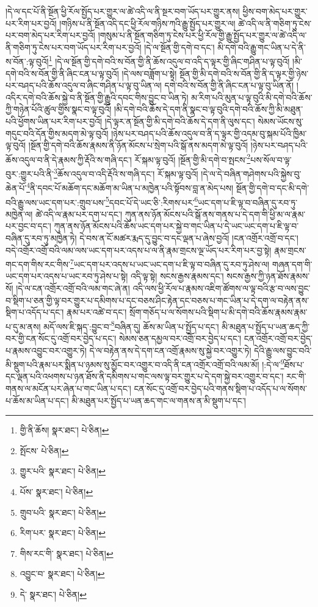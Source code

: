 །དེ་ལ་དང་པོ་ནི་སྔོན་ཕྱི་རོལ་སྤྱོད་པར་གྱུར་ལ་ཚེ་འདི་ལ་ནི་སྔར་བག་ཡོད་པར་གྱུར་ནས། ཕྱིས་བག་མེད་པར་གྱུར་པར་རིག་པར་བྱའོ། །གཉིས་པ་ནི་སྔོན་འདི་དང་ཕྱི་རོལ་གཉིས་ཀའི་རྒྱུ་སྤྱོད་པར་གྱུར་ལ། ཚེ་འདི་ལ་ནི་གཅིག་ཏུ་ངེས་པར་བག་མེད་པར་རིག་པར་བྱའོ། །གསུམ་པ་ནི་སྔོན་གཅིག་ཏུ་ངེས་པར་ཕྱི་རོལ་གྱི་རྒྱུ་སྤྱོད་པར་གྱུར་ལ་ཚེ་འདི་ལ་ནི་གཅིག་ཏུ་ངེས་པར་བག་ཡོད་པར་རིག་པར་བྱའོ། །དེ་ལ་སྔོན་གྱི་དགེ་བ་དང་། མི་དགེ་བའི་རྒྱུ་གང་ཡིན་པ་དེ་ནི་ས་བོན་:ལྟ་བུའོ།\footnote{གྱི་ནི་ཆོས།  སྣར་ཐང་།  པེ་ཅིན། } །དེ་ལ་སྔོན་གྱི་དགེ་བའི་ས་བོན་གྱི་ནི་ཆོས་འདུལ་བ་འདི་ད་ལྟར་གྱི་ཞིང་གཤིན་པ་ལྟ་བུའོ། །མི་དགེ་བའི་ས་བོན་གྱི་ནི་ཞིང་ངན་པ་ལྟ་བུའོ། །དེ་ལས་བཟློག་པ་སྟེ། སྔོན་གྱི་མི་དགེ་བའི་ས་བོན་གྱི་ནི་ད་ལྟར་གྱི་ཉེས་པར་བཤད་པའི་ཆོས་འདུལ་བ་ཞིང་གཤིན་པ་ལྟ་བུ་ཡིན་ལ། དགེ་བའི་ས་བོན་གྱི་ནི་ཞིང་ངན་པ་ལྟ་བུ་ཡིན་ནོ། །འདིར་དགེ་བའི་ཆོས་སྐྱེ་བ་ནི་སྔོན་གྱི་རྒྱུའི་དབང་གིས་བྱུང་བ་ཡིན་ཏེ། མ་རིག་པའི་མུན་པ་ལྟ་བུའི་མི་དགེ་བའི་ཆོས་ཀྱི་གཉེན་པོའི་ཚུལ་གྱིས་སྣང་བ་ལྟ་བུའོ། །མི་དགེ་བའི་ཆོས་དེ་དག་ནི་སྣང་བ་ལྟ་བུའི་དགེ་བའི་ཆོས་ཀྱི་མི་མཐུན་པའི་ཕྱོགས་ཡིན་པར་རིག་པར་བྱའོ། །དེ་ལྟར་ན་སྔོན་གྱི་མི་དགེ་བའི་ཆོས་དེ་དག་ནི་ལུས་དང་། སེམས་ཡོངས་སུ་གདུང་བའི་དོན་གྱིས་མདག་མེ་ལྟ་བུའོ། །ཉེས་པར་བཤད་པའི་ཆོས་འདུལ་བ་ནི་ད་ལྟར་གྱི་འདམ་བུ་སྐམ་པོའི་ཁྱིམ་ལྟ་བུའོ། །སྔོན་གྱི་དགེ་བའི་ཆོས་རྣམས་ནི་ཉོན་མོངས་པ་སྲེག་པའི་སྒོ་ནས་མདག་མེ་ལྟ་བུའོ། །ཉེས་པར་བཤད་པའི་ཆོས་འདུལ་བ་ནི་དེ་རྣམས་ཀྱི་རྡོའི་ས་གཞི་དང་། རོ་སྐམ་ལྟ་བུའོ། །སྔོན་གྱི་མི་དགེ་བ་སྤངས་\footnote{སྤོངས་  པེ་ཅིན། }པས་སོལ་བ་ལྟ་བུར་:གྱུར་པའི་ནི་\footnote{གྱུར་པའི་  སྣར་ཐང་།  པེ་ཅིན། }ཆོས་འདུལ་བ་འདི་རྡོའི་ས་གཞི་དང་། རོ་སྐམ་ལྟ་བུའོ། །དེ་ལ་དེ་བཞིན་གཤེགས་པའི་སྐྱེས་བུ་ཆེན་པོ་\footnote{པོས་  སྣར་ཐང་།  པེ་ཅིན། }ནི་དབང་པོ་མཆོག་དང་མཆོག་མ་ཡིན་པ་མཁྱེན་པའི་སྟོབས་བླ་ན་མེད་པས། སྔོན་གྱི་དགེ་བ་དང་མི་དགེ་བའི་རྒྱུ་ལས་ཡང་དག་པར་:གྲུབ་པས་\footnote{གྲུབ་པའི་  སྣར་ཐང་།  པེ་ཅིན། }དབང་པོ་དེ་ཡང་ཅི་:རིགས་པར་\footnote{རིག་པར་  སྣར་ཐང་།  པེ་ཅིན། }ཡང་དག་པ་ཇི་ལྟ་བ་བཞིན་དུ་རབ་ཏུ་མཁྱེན་ལ། ཚེ་འདི་ལ་རྣམ་པར་དག་པ་དང་། ཀུན་ནས་ཉོན་མོངས་པའི་སྒོ་ནས་གནས་པ་དེ་དག་གི་ཕྱི་མ་ལ་རྣམ་པར་བྱང་བ་དང་། ཀུན་ནས་ཉོན་མོངས་པའི་ཆོས་ཡང་དག་པར་སྐྱེ་བ་གང་ཡིན་པ་དེ་ཡང་ཡང་དག་པ་ཇི་ལྟ་བ་བཞིན་དུ་རབ་ཏུ་མཁྱེན་ཏེ། དེ་བས་ན་ངོ་མཚར་རྨད་དུ་བྱུང་བ་དང་ལྡན་པ་ཞེས་བྱའོ། །ངན་འགྲོར་འགྲོ་བ་དང་། བདེ་འགྲོར་འགྲོ་བའི་ལམ་ལས་ཡང་དག་པར་འདས་པ་ལ་ནི་རྣམ་གྲངས་ལྔ་ཡོད་པར་རིག་པར་བྱ་སྟེ། རྣམ་གྲངས་གང་དག་གིས་རང་གིས་\footnote{གིས་རང་གི་  སྣར་ཐང་།  པེ་ཅིན། }ཡང་དག་པར་འདས་པ་ཡང་ཡང་དག་པ་ཇི་ལྟ་བ་བཞིན་དུ་རབ་ཏུ་ཤེས་ལ། གཞན་དག་གི་ཡང་དག་པར་འདས་པ་ཡང་རབ་ཏུ་ཤེས་པ་སྟེ། འདི་ལྟ་སྟེ། སངས་རྒྱས་རྣམས་དང་། སངས་རྒྱས་ཀྱི་ཉན་ཐོས་རྣམས་སོ། །དེ་ལ་ངན་འགྲོར་འགྲོ་བའི་ལམ་གང་ཞེ་ན། འདི་ལས་ཕྱི་རོལ་པ་རྣམས་འཇིག་ཚོགས་ལ་ལྟ་བའི་རྩ་བ་ལས་བྱུང་བ་སྡིག་པ་ཅན་གྱི་ལྟ་བར་གྱུར་པ་དམིགས་པ་དང་བཅས་ཤིང་རྟེན་དང་བཅས་པ་གང་ཡིན་པ་དེ་དག་ལ་བརྟེན་ནས་སྡིག་པ་འདོད་པ་དང་། རྣམ་པར་འཚེ་བ་དང་། སྲོག་གཅོད་པ་ལ་སོགས་པའི་སྡིག་པ་མི་དགེ་བའི་ཆོས་རྣམས་རྣམ་པ་དུ་མ་ནས། མདོ་ལས་ཇི་སྐད་:བྱུང་བ་\footnote{འབྱུང་བ་  སྣར་ཐང་།  པེ་ཅིན། }བཞིན་དུ། ཆོས་མ་ཡིན་པ་སྤྱོད་པ་དང་། མི་མཐུན་པ་སྤྱོད་པ་ཡན་ཆད་ཀྱི་བར་གྱི་ངན་སོང་དུ་འགྲོ་བར་བྱེད་པ་དང་། སེམས་ཅན་དམྱལ་བར་འགྲོ་བར་བྱེད་པ་དང་། ངན་འགྲོར་འགྲོ་བར་བྱེད་པ་རྣམས་འབྱུང་བར་འགྱུར་ཏེ། དེ་ལ་བརྟེན་ནས་དེ་དག་ངན་འགྲོ་རྣམས་སུ་སྐྱེ་བར་འགྱུར་ཏེ། དེའི་རྒྱུ་ལས་བྱུང་བའི་མི་སྡུག་པའི་རྣམ་པར་སྨིན་པ་ཉམས་སུ་མྱོང་བར་འགྱུར་བ་འདི་ནི་ངན་འགྲོར་འགྲོ་བའི་ལམ་མོ། །:དེ་ལ་\footnote{དེ་  སྣར་ཐང་།  པེ་ཅིན། }ཐོས་པ་དང་ལྡན་པའི་འཕགས་པ་ཉན་ཐོས་ནི་དམིགས་པ་གང་ལས་ལྟ་བར་གྱུར་པ་དེ་དག་སྐྱེ་བར་འགྱུར་བ་དང་། རང་གི་གནས་ལ་མངོན་པར་ཞེན་པ་གང་ཡིན་པ་དང་། ངན་སོང་དུ་འགྲོ་བར་བྱེད་པའི་གནས་སྡིག་པ་འདོད་པ་ལ་སོགས་པ་ཆོས་མ་ཡིན་པ་དང་། མི་མཐུན་པར་སྤྱོད་པ་ཡན་ཆད་གང་ལ་གནས་ན་མི་སྡུག་པ་དང་། 